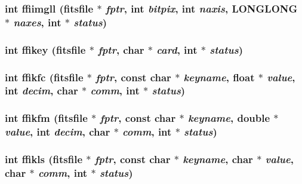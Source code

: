 \subsubsection{\setlength{\rightskip}{0pt plus 5cm}int ffiimgll (\bf{fitsfile} $\ast$ {\em fptr}, int {\em bitpix}, int {\em naxis}, \bf{LONGLONG} $\ast$ {\em naxes}, int $\ast$ {\em status})}\label{test_2shm__client_2fitsio_8h_657626db84e4c427330c2684375832d5}


\subsubsection{\setlength{\rightskip}{0pt plus 5cm}int ffikey (\bf{fitsfile} $\ast$ {\em fptr}, char $\ast$ {\em card}, int $\ast$ {\em status})}\label{test_2shm__client_2fitsio_8h_3fad2ca6c44422526a0994f06d424607}


\subsubsection{\setlength{\rightskip}{0pt plus 5cm}int ffikfc (\bf{fitsfile} $\ast$ {\em fptr}, const char $\ast$ {\em keyname}, float $\ast$ {\em value}, int {\em decim}, char $\ast$ {\em comm}, int $\ast$ {\em status})}\label{test_2shm__client_2fitsio_8h_39166dca79658791f345fcd1af07329d}


\subsubsection{\setlength{\rightskip}{0pt plus 5cm}int ffikfm (\bf{fitsfile} $\ast$ {\em fptr}, const char $\ast$ {\em keyname}, double $\ast$ {\em value}, int {\em decim}, char $\ast$ {\em comm}, int $\ast$ {\em status})}\label{test_2shm__client_2fitsio_8h_a7af1984471fc7e31de5f5a5111407e4}


\subsubsection{\setlength{\rightskip}{0pt plus 5cm}int ffikls (\bf{fitsfile} $\ast$ {\em fptr}, const char $\ast$ {\em keyname}, char $\ast$ {\em value}, char $\ast$ {\em comm}, int $\ast$ {\em status})}\label{test_2shm__client_2fitsio_8h_b9a20f40733eee26b83630247c6c7d6c}


